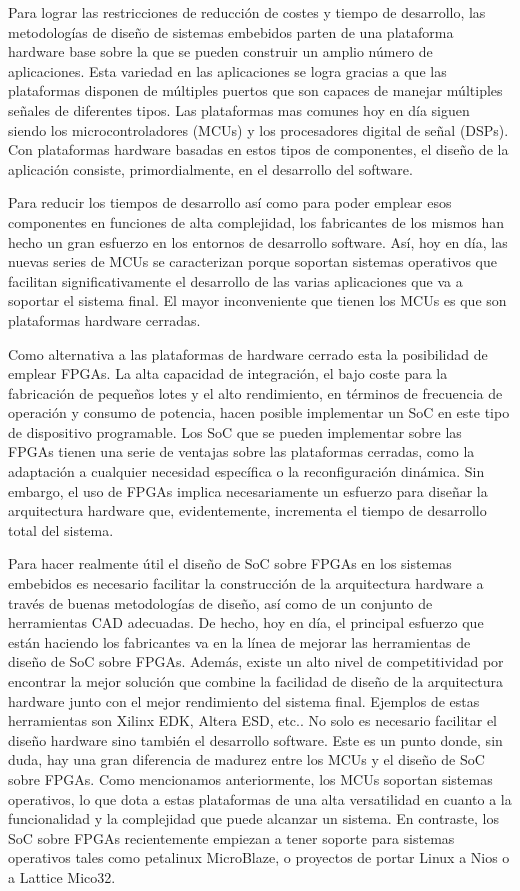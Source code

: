 Para lograr las restricciones de reducción de costes y tiempo de desarrollo, las metodologías de diseño de sistemas embebidos parten de una
plataforma hardware base sobre la que se pueden construir un amplio número de aplicaciones. Esta variedad en las aplicaciones se logra gracias a que
las plataformas disponen de múltiples puertos que son capaces de manejar múltiples señales de diferentes tipos. Las plataformas mas comunes hoy en
día siguen siendo los microcontroladores (MCUs) y los procesadores digital de señal (DSPs). Con plataformas hardware basadas en  estos tipos de
componentes, el diseño de la aplicación consiste, primordialmente, en el desarrollo del software.

Para reducir los tiempos de desarrollo así como para poder emplear esos componentes en funciones de alta complejidad, los fabricantes de los mismos
han hecho un gran esfuerzo en los entornos de desarrollo software. Así, hoy en día, las nuevas series de MCUs se caracterizan porque soportan
sistemas operativos que facilitan significativamente el desarrollo de las varias aplicaciones que va a soportar el sistema final. El mayor
inconveniente que tienen los MCUs es que son plataformas hardware cerradas.

Como alternativa a las plataformas de hardware cerrado esta la posibilidad de emplear FPGAs. La alta capacidad de integración, el bajo
coste para la fabricación de pequeños lotes y el alto rendimiento, en términos de frecuencia de operación y consumo de potencia, hacen posible
implementar un SoC en este tipo de dispositivo programable. Los SoC que se pueden implementar sobre las FPGAs tienen una serie de ventajas sobre las
plataformas cerradas, como la adaptación a cualquier necesidad específica o la reconfiguración dinámica. Sin embargo, el uso de FPGAs implica
necesariamente un esfuerzo para diseñar la arquitectura hardware que, evidentemente, incrementa el tiempo de desarrollo total del sistema.

Para hacer realmente útil el diseño de SoC sobre FPGAs en los sistemas embebidos es necesario facilitar la construcción de la arquitectura hardware a
través de buenas metodologías de diseño, así como de un conjunto de herramientas CAD adecuadas. De hecho, hoy en día, el principal esfuerzo que están
haciendo los fabricantes va en la línea de mejorar las herramientas de diseño de SoC sobre FPGAs. Además, existe un alto nivel de competitividad por
encontrar la mejor solución que combine la facilidad de diseño de la arquitectura hardware junto con el mejor rendimiento del sistema final. Ejemplos
de estas herramientas son Xilinx EDK, Altera ESD, etc.. No solo es necesario facilitar el diseño hardware sino también el desarrollo software. Este
es un punto donde, sin duda, hay una gran diferencia de madurez entre los MCUs y el diseño de SoC sobre FPGAs. Como mencionamos anteriormente, los
MCUs soportan sistemas operativos, lo que dota a estas plataformas de una alta versatilidad en cuanto a la funcionalidad y la complejidad que puede
alcanzar un sistema. En contraste, los SoC sobre FPGAs recientemente empiezan a tener soporte para sistemas operativos tales como petalinux
MicroBlaze, o proyectos de portar Linux a Nios o a Lattice Mico32.


